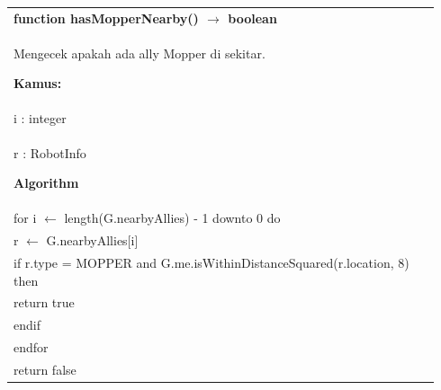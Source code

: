 \documentclass{article}
\newenvironment{pseudobox}
{
\centering
\begin{longtable}{|p{0.94\linewidth}|}
\hline
}
{
\\ \hline
\end{longtable}
\vspace{0.05cm}
}
\begin{document}
\begin{pseudobox}
\textbf{function hasMopperNearby() $\rightarrow$ boolean} \\
{ Mengecek apakah ada ally Mopper di sekitar. }

\textbf{Kamus:} \\
\hspace*{1em} i : integer \\
\hspace*{1em} r : RobotInfo

\textbf{Algorithm} \\
\hspace*{1em} for i $\leftarrow$ length(G.nearbyAllies) - 1 downto 0 do \\
\hspace*{2em} r $\leftarrow$ G.nearbyAllies[i] \\
\hspace*{2em} if r.type = MOPPER and G.me.isWithinDistanceSquared(r.location, 8) then \\
\hspace*{3em} return true \\
\hspace*{2em} endif \\
\hspace*{1em} endfor \\

\hspace*{1em} return false
\end{pseudobox}
\end{document}

